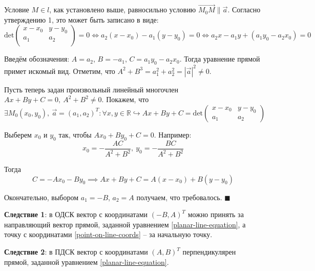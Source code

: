 \documentclass[12pt, a4paper, reqno]{article}
\begin{document}
    Условие $M \in l$, как установлено выше, равносильно условию $\overrightarrow{M_0M} \parallel \vec{a}$.
    Согласно утверждению 1, это может быть записано в виде:
    \begin{equation*}
        \text{det}
        \begin{pmatrix}
            x - x_0 & y - y_0 \\
            a_1     & a_2     \\
        \end{pmatrix} = 0 \iff
        a_2 (x - x_0) - a_1 (y - y_0) = 0 \iff
        a_2 x - a_1 y + (a_1 y_0 - a_2 x_0) = 0
    \end{equation*}

    Введём обозначения: $A = a_2$, $B = -a_1$, $C = a_1 y_0 - a_2 x_0$. Тогда уравнение прямой
    примет искомый вид. Отметим, что $A^2 + B^3 = a_1^2 + a_2^2 = |\vec{a}|^2 \neq 0$.

    Пусть теперь задан произвольный линейный многочлен $Ax + By + C = 0,\ A^2 + B^2 \neq 0$. Покажем,
    что
    \begin{equation*}
        \exists M_0(x_0, y_0),\ \vec{a} = (a_1, a_2)^T: \forall x, y \in \mathbb{R} \hookrightarrow
        Ax + By + C = \text{det}
        \begin{pmatrix}
            x - x_0 & y - y_0 \\
            a_1     & a_2
        \end{pmatrix}
    \end{equation*}

    Выберем $x_0$ и $y_0$ так, чтобы $Ax_0 + By_0 + C = 0$. Например:
    \begin{equation}\label{point-on-line-coords}
        x_0 = -\frac{AC}{A^2 + B^2},\ y_0 = -\frac{BC}{A^2 + B^2}
    \end{equation}

    Тогда
    \begin{equation*}
        C = -Ax_0 - By_0 \implies Ax + By + C = A(x - x_0) + B(y - y_0)
    \end{equation*}

    Окончательно, выбором $a_1 = -B$, $a_2 = A$ получаем, что требовалось.
    $\blacksquare$

    \textbf{Следствие 1}: в ОДСК вектор с координатами $(-B, A)^T$ можно принять за направляющий
    вектор прямой, заданной уравнением \eqref{planar-line-equation}, а точку с координатами
    \eqref{point-on-line-coords} -- за начальную точку.

    \textbf{Следствие 2}: в ПДСК вектор с координатами $(A, B)^T$ перпендикулярен прямой, заданной
    уравнением \eqref{planar-line-equation}.
\end{document}
